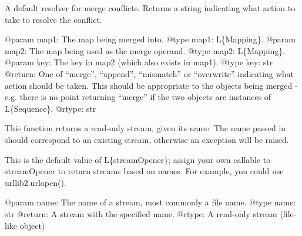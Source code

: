 \documentclass[a4paper,10pt,english]{sphinxmanual}
\begin{document}

\begin{fulllineitems}
\label{commands/apidoc/src:src.pyconf.deepCopyMapping}
\end{fulllineitems}


\begin{fulllineitems}
\label{commands/apidoc/src:src.pyconf.defaultMergeResolve}
A default resolver for merge conflicts. 
Returns a string indicating what action to take to resolve the conflict.

@param map1: The map being merged into.
@type map1: L\{Mapping\}.
@param map2: The map being used as the merge operand.
@type map2: L\{Mapping\}.
@param key: The key in map2 (which also exists in map1).
@type key: str
@return: One of ``merge'', ``append'', ``mismatch'' or ``overwrite'' 
indicating what action should be taken. This should
be appropriate to the objects being merged - e.g.
there is no point returning ``merge'' if the two objects
are instances of L\{Sequence\}.
@rtype: str

\end{fulllineitems}


\begin{fulllineitems}
\label{commands/apidoc/src:src.pyconf.defaultStreamOpener}
This function returns a read-only stream, given its name. The name passed
in should correspond to an existing stream, otherwise an exception will be
raised.

This is the default value of L\{streamOpener\}; assign your own callable to
streamOpener to return streams based on names. For example, you could use
urllib2.urlopen().

@param name: The name of a stream, most commonly a file name.
@type name: str
@return: A stream with the specified name.
@rtype: A read-only stream (file-like object)

\end{fulllineitems}
\end{document}
